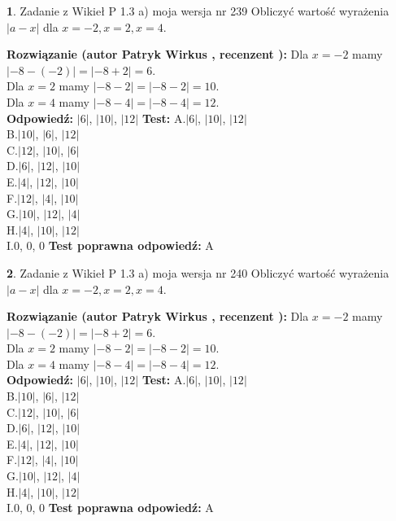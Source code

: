 \documentclass[12pt, a4paper]{article}
\theoremstyle{definition} %
\newtheorem{zad}{}
\newcommand{\zadStart}[1]{\begin{zad}#1\newline}
\newcommand{\zadStop}{\end{zad}}
\newcommand{\rozwStart}[2]{\noindent \textbf{Rozwiązanie (autor #1 , recenzent #2): }\newline}
\newcommand{\rozwStop}{\newline}
\newcommand{\odpStart}{\noindent \textbf{Odpowiedź:}\newline}
\newcommand{\odpStop}{\newline}
\newcommand{\testStart}{\noindent \textbf{Test:}\newline}
\newcommand{\testStop}{\newline}
\newcommand{\kluczStart}{\noindent \textbf{Test poprawna odpowiedź:}\newline}
\newcommand{\kluczStop}{\newline}
\begin{document}
\zadStart{Zadanie z Wikieł P 1.3 a) moja wersja nr 239}
Obliczyć wartość wyrażenia $|a - x|$ dla $x=-2,x=2,x=4$.
\zadStop
\rozwStart{Patryk Wirkus}{}
Dla $x = -2$ mamy $|-8 - (-2)| = |-8 + 2| = 6$.\\
Dla $x = 2$ mamy $|-8 - 2| = |-8 - 2| = 10$.\\
Dla $x = 4$ mamy $|-8 - 4| = |-8 - 4| = 12$.\\
\rozwStop
\odpStart
$|6|$, $|10|$, $|12|$
\odpStop
\testStart
A.$|6|$, $|10|$, $|12|$\\
B.$|10|$, $|6|$, $|12|$\\
C.$|12|$, $|10|$, $|6|$\\
D.$|6|$, $|12|$, $|10|$\\
E.$|4|$, $|12|$, $|10|$\\
F.$|12|$, $|4|$, $|10|$\\
G.$|10|$, $|12|$, $|4|$\\
H.$|4|$, $|10|$, $|12|$\\
I.$0$, $0$, $0$
\testStop
\kluczStart
A
\kluczStop



\zadStart{Zadanie z Wikieł P 1.3 a) moja wersja nr 240}
Obliczyć wartość wyrażenia $|a - x|$ dla $x=-2,x=2,x=4$.
\zadStop
\rozwStart{Patryk Wirkus}{}
Dla $x = -2$ mamy $|-8 - (-2)| = |-8 + 2| = 6$.\\
Dla $x = 2$ mamy $|-8 - 2| = |-8 - 2| = 10$.\\
Dla $x = 4$ mamy $|-8 - 4| = |-8 - 4| = 12$.\\
\rozwStop
\odpStart
$|6|$, $|10|$, $|12|$
\odpStop
\testStart
A.$|6|$, $|10|$, $|12|$\\
B.$|10|$, $|6|$, $|12|$\\
C.$|12|$, $|10|$, $|6|$\\
D.$|6|$, $|12|$, $|10|$\\
E.$|4|$, $|12|$, $|10|$\\
F.$|12|$, $|4|$, $|10|$\\
G.$|10|$, $|12|$, $|4|$\\
H.$|4|$, $|10|$, $|12|$\\
I.$0$, $0$, $0$
\testStop
\kluczStart
A
\kluczStop
\end{document}
